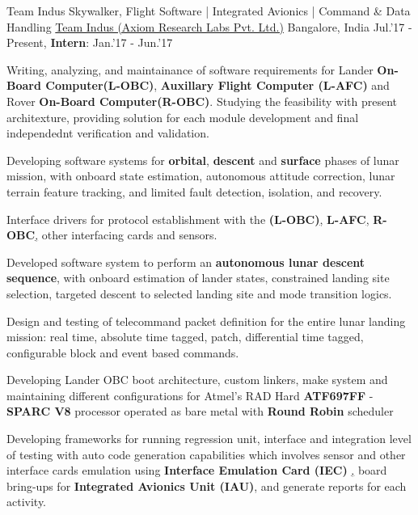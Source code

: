 \begin{cventries}
	\cventry
	{Team Indus Skywalker, Flight Software | Integrated Avionics | Command \& Data Handling}
	{\href{http://www.teamindus.in/}{Team Indus (Axiom Research Labs Pvt. Ltd.)}}
	{Bangalore, India}
	{Jul.'17 - Present, \textbf{Intern}: Jan.'17 - Jun.'17}
	{
		\begin{cvitems}
			\item{Writing, analyzing, and maintainance of software requirements for Lander \textbf{On-Board Computer(L-OBC)}, \textbf{Auxillary Flight Computer (L-AFC)} and Rover \textbf{On-Board Computer(R-OBC)}. Studying the feasibility with present architexture, providing solution for each module development and final independednt verification and validation.}
			\item{Developing software systems for \textbf{orbital}, \textbf{descent} and \textbf{surface} phases of lunar mission, with onboard state estimation, autonomous attitude correction, lunar terrain feature tracking, and limited fault detection, isolation, and recovery.}
			\item{Interface drivers for protocol establishment with the \textbf{(L-OBC)}\href{http://ww1.microchip.com/downloads/en/DeviceDoc/ATF697FF.pdf}, \textbf{L-AFC}\href{http://zedboard.org/product/zedboard}, \textbf{R-OBC}\href{http://zedboard.org/product/zedboard}, other interfacing cards and sensors.}
			\item{Developed software system to perform an \textbf{autonomous lunar descent sequence}, with onboard estimation of lander states, constrained landing site selection, targeted descent to selected landing site and mode transition logics.}
			\item{Design and testing of telecommand packet definition for the entire lunar landing mission: real time, absolute time tagged, patch, differential time tagged, configurable block and event based commands.}
			\item{Developing Lander OBC boot architecture, custom linkers, make system and maintaining different configurations for Atmel's RAD Hard \textbf{ATF697FF} - \textbf{SPARC V8} processor operated as bare metal with \textbf{Round Robin} scheduler}
			\item{Developing frameworks for running regression unit, interface and integration level of testing with auto code generation capabilities which involves sensor and other interface cards emulation using \textbf{Interface Emulation Card (IEC) }\href{http://zedboard.org/product/microzed/}, board bring-ups for \textbf{Integrated Avionics Unit (IAU)}, and generate reports for each activity.}

\end{cvitems}}
\end{cventries}
